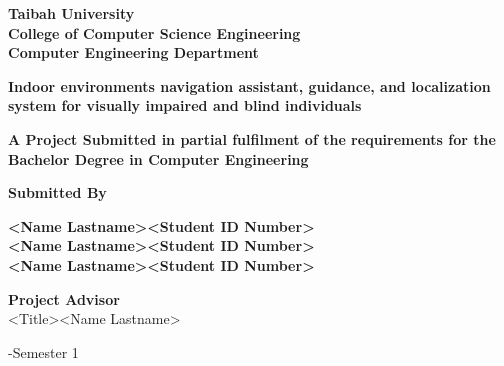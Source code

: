 \begin{titlepage}
    {\titlefont \textbf{Taibah University}}\\
    {\titlefont \textbf{College of Computer Science Engineering}}\\
    {\titlefont \textbf{Computer Engineering Department}}\\
    
    \vspace{1.8cm}
    
    {\titlefont \textbf{Indoor environments navigation assistant, guidance, and localization system for visually impaired and blind individuals}}
    
    \vspace{1.8cm}

    {\titlefont \fontsize{14}{16} \textbf{A Project Submitted in partial fulfilment of the requirements for the Bachelor Degree in Computer Engineering}}
    \vspace{1.8cm}
    
    {\titlefont \textbf{Submitted By}}\\
    \vspace{1cm}

    {\titlefont \textbf{\textless Name Lastname\textgreater \textless Student ID Number\textgreater}} \\[0.2cm]
    {\titlefont \textbf{\textless Name Lastname\textgreater \textless Student ID Number\textgreater}} \\[0.2cm]
    {\titlefont \textbf{\textless Name Lastname\textgreater \textless Student ID Number\textgreater}}
    \vspace{1.8cm}

    {\selectfont\fontsize{14}{16}\normalfont
    \textbf{Project Advisor}\\
    \textless Title\textgreater \textless Name Lastname\textgreater
    }
    
    \vspace{2cm}

    {\selectfont\fontsize{14}{16}-Semester 1
    }

\end{titlepage}
